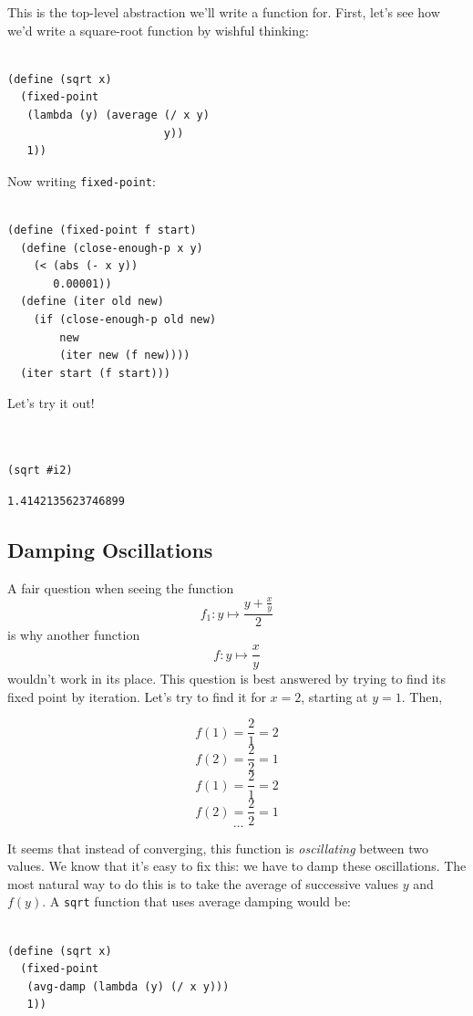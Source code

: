 \documentclass[9pt]{report}
\begin{document}
This is the top-level abstraction we'll write a function for.
First, let's see how we'd write a square-root function by wishful
thinking:

\begin{verbatim}

(define (sqrt x)
  (fixed-point
   (lambda (y) (average (/ x y)
                        y))
   1))
\end{verbatim}

Now writing \texttt{fixed-point}:

\begin{verbatim}

(define (fixed-point f start)
  (define (close-enough-p x y)
    (< (abs (- x y))
       0.00001))
  (define (iter old new)
    (if (close-enough-p old new)
        new
        (iter new (f new))))
  (iter start (f start)))
\end{verbatim}

Let's try it out!

\begin{verbatim}


(sqrt #i2)
\end{verbatim}

\begin{verbatim}
1.4142135623746899
\end{verbatim}

\subsection{Damping Oscillations}
\label{sec:orgeb56c40}

A fair question when seeing the function
$$f_1\colon y\mapsto \frac{y+\frac{x}{y}}{2}$$
is why another function
$$f\colon y\mapsto \frac{x}{y}$$
wouldn't work in its place. This question is best
answered by trying to find its fixed point by iteration. Let's try
to find it for \(x=2\), starting at \(y=1\). Then,

$$f(1) = \frac{2}{1} = 2$$
$$f(2) = \frac{2}{2} = 1$$
$$f(1) = \frac{2}{1} = 2$$
$$f(2) = \frac{2}{2} = 1$$
$$~\dots$$

It seems that instead of converging, this function is
\emph{oscillating} between two values. We know that it's easy to fix
this: we have to damp these oscillations. The most natural way to
do this is to take the average of successive values \(y\) and
\(f(y)\). A \texttt{sqrt} function that uses average damping would be:

\begin{verbatim}

(define (sqrt x)
  (fixed-point
   (avg-damp (lambda (y) (/ x y)))
   1))
\end{verbatim}
\end{document}

